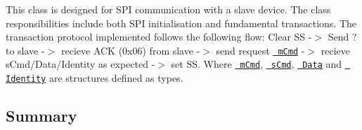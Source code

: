 This class is designed for S\+PI communication with a slave device. The class responsibilities include both S\+PI initialisation and fundamental transactions. The transaction protocol implemented follows the following flow\+: Clear SS -\/$>$ Send \textquotesingle{}?\textquotesingle{} to slave -\/$>$ recieve \textquotesingle{}A\+CK\textquotesingle{} (0x06) from slave -\/$>$ send request \href{\#structm_cmd}{\texttt{ m\+Cmd}} -\/$>$ recieve s\+Cmd/\+Data/\+Identity as expected -\/$>$ set SS. Where \href{\#structm_cmd}{\texttt{ m\+Cmd}}, \href{\#structs_cmd}{\texttt{ s\+Cmd}}, \href{\#struct_data}{\texttt{ Data}} and \href{\#struct_identity}{\texttt{ Identity}} are structures defined as types.

\subsection*{Summary}

